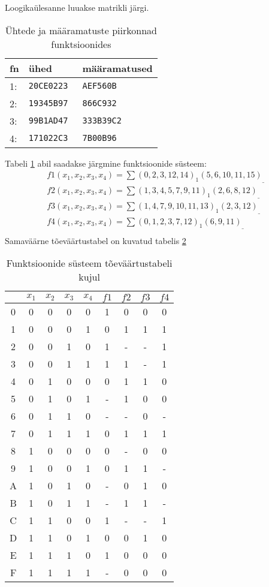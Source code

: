 Loogikaülesanne luuakse matrikli \studentcode{} järgi.

\begin{table}[!ht]
\centering
\begin{tabular}{|l l l|}
 \hline
 fn & ühed & määramatused \\
 \hline
 1: & \tt{20CE0223} & \tt{AEF560B} \\
 2: & \tt{19345B97} & \tt{866C932} \\
 3: & \tt{99B1AD47} & \tt{333B39C2} \\
 4: & \tt{171022C3} & \tt{7B00B96} \\
 \hline
\end{tabular}
\caption{Ühtede ja määramatuste piirkonnad funktsioonides}
\label{table:1}
\end{table}

Tabeli \ref{table:1} abil saadakse järgmine funktsioonide süsteem:
\[\begin{array}{l}
f1(x_1, x_2, x_3, x_4) = \sum(0,2,3,12,14)_1 (5,6,10,11,15)_\_ \\
f2(x_1, x_2, x_3, x_4) = \sum(1,3,4,5,7,9,11)_1 (2,6,8,12)_\_ \\
f3(x_1, x_2, x_3, x_4) = \sum(1,4,7,9,10,11,13)_1 (2,3,12)_\_ \\
f4(x_1, x_2, x_3, x_4) = \sum(0,1,2,3,7,12)_1 (6,9,11)_\_ \\
\end{array}\]
Samaväärne tõeväärtustabel on kuvatud tabelis \ref{table:2}
\begin{table}[ht!]
    \centering
    \begin{tabular}{|c|c c c c|c c c c|}
            \hline
            & \(x_1\)&\(x_2\)&\(x_3\)&\(x_4\) & \(f1\)&\(f2\)&\(f3\)&\(f4\)\\
            \hline
            0 & 0&0&0&0 & 1&0&0&0\\
            1 & 0&0&0&1 & 0&1&1&1\\
            2 & 0&0&1&0 & 1&-&-&1\\
            3 & 0&0&1&1 & 1&1&-&1\\
            \hline
            4 & 0&1&0&0 & 0&1&1&0\\
            5 & 0&1&0&1 & -&1&0&0\\
            6 & 0&1&1&0 & -&-&0&-\\
            7 & 0&1&1&1 & 0&1&1&1\\
            \hline
            8 & 1&0&0&0 & 0&-&0&0\\
            9 & 1&0&0&1 & 0&1&1&-\\
            A & 1&0&1&0 & -&0&1&0\\
            B & 1&0&1&1 & -&1&1&-\\
            \hline
            C & 1&1&0&0 & 1&-&-&1\\
            D & 1&1&0&1 & 0&0&1&0\\
            E & 1&1&1&0 & 1&0&0&0\\
            F & 1&1&1&1 & -&0&0&0\\
            \hline
    \end{tabular}
    \caption{Funktsioonide süsteem tõeväärtustabeli kujul}
    \label{table:2}
\end{table}{}